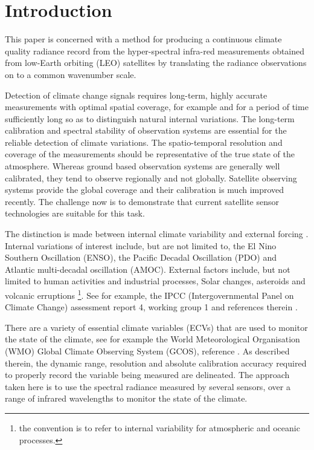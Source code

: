\documentclass[twocolumn,10pt]{article}
\begin{document}
\section{Introduction}
\label{sec:orgheadline2}

This paper is concerned with a method for producing a continuous climate quality radiance record from the hyper-spectral infra-red measurements obtained from low-Earth orbiting (LEO) satellites by translating the radiance observations on to a common wavenumber scale.

Detection of climate change signals requires long-term, highly accurate measurements with optimal spatial coverage, for example \cite{wielicki2013} and for a period of time sufficiently long so as to distinguish natural internal variations. The long-term calibration and spectral stability of observation systems are essential for the reliable detection of climate variations. The spatio-temporal resolution and coverage of the measurements should be representative of the true state of the atmosphere. Whereas ground based observation systems are generally well calibrated, they tend to observe regionally and not globally. Satellite observing systems provide the global coverage and their calibration is much improved recently. The challenge now is to demonstrate that current satellite sensor technologies are suitable for this task.

The distinction is made between internal climate variability and external forcing \cite{solomon2010}. Internal variations of interest include, but are not limited to, the El Nino Southern Oscillation (ENSO), the Pacific Decadal Oscillation (PDO) and Atlantic multi-decadal oscillation (AMOC). External factors include, but not limited to human activities and industrial processes, Solar changes, asteroids and volcanic erruptions \footnote{the convention is to refer to internal variability for atmospheric and oceanic processes. }. See for example, the IPCC (Intergovernmental Panel on Climate Change) assessment report 4, working group 1 and references therein \cite{ipcc2007_wg1}. 

There are a variety of essential climate variables (ECVs) that are used to monitor the state of the climate, see for example the World Meteorological Organisation (WMO) Global Climate Observing System (GCOS), reference \cite{gcos}. As described therein, the dynamic range, resolution and absolute calibration accuracy required to properly record the variable being measured are delineated. The approach taken here is to use the spectral radiance measured by several sensors, over a range of infrared wavelengths to monitor the state of the climate.
\end{document}
